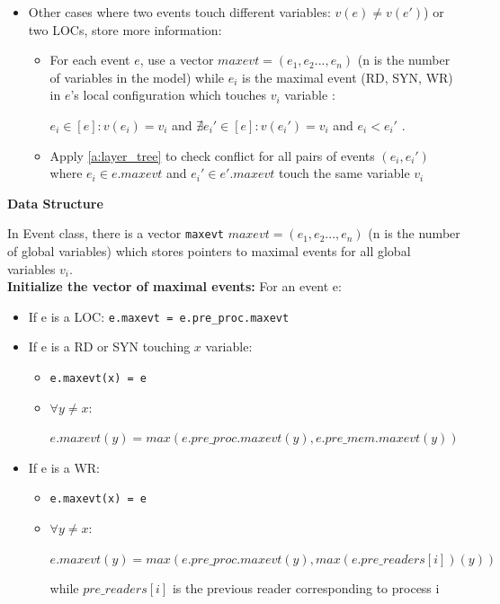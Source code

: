 \documentclass{llncs}
\begin{document}
\begin{enumerate}
\begin{itemize}
			\item Other cases where two events touch different variables: $v(e) \neq v(e')$) or two LOCs, store more information:	
			\begin{itemize}
				\item For each event $e$, use a vector $maxevt = (e_1, e_2...,e_n)$  (n is the number of variables in the model)
				while $e_i$ is the maximal event (RD, SYN, WR) in $e$'s local configuration which touches $v_i$ variable :
				
				$e_i \in  \left[ e \right]: v(e_i) = v_i$ 
				and $ \nexists e_i' \in \left[ e \right] : v(e_i') = v_i$ 
				and $e_i < e_i'$ .
				\item Apply \cref{a:layer_tree} to check conflict for all pairs of events $(e_i, e_i')$ where $e_i \in e.maxevt$ and $e_i'\in e'.maxevt$ touch the same variable $v_i$
			\end{itemize}	
		\end{itemize}
\end{enumerate}

\noindent
\textbf{Data Structure}

In Event class, there is a vector \verb!maxevt! $maxevt = (e_1, e_2...,e_n)$ (n is the number of global variables) which stores pointers to maximal events for all global variables $v_i$.\\

\noindent
\textbf{Initialize the vector of maximal events:}
For an event e:
\begin{itemize}
\item
	If e is a LOC: \verb!e.maxevt = e.pre_proc.maxevt!
\item
	If e is a RD or SYN touching $x$ variable: 
	\begin{itemize}
	\item
		\verb!e.maxevt(x) = e!
	\item	
		$\forall y \neq x$: 
		
		$e.maxevt(y) = max(e.pre\_proc.maxevt(y), e.pre\_mem.maxevt(y) )$
	\end{itemize}
\item
	If e is a WR: 
	\begin{itemize}
	\item
		\verb!e.maxevt(x) = e!
	\item	
		$\forall y \neq x$:
		
		$e.maxevt(y) = max(e.pre\_proc.maxevt(y), max(e.pre\_readers[i])(y))$
		
		while $pre\_readers[i]$ is the previous reader corresponding to process i 
		
	\end{itemize}
\end{itemize}
\end{document}
